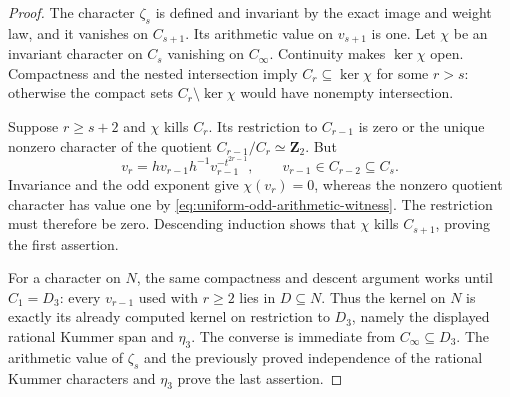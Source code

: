 \begin{proof}
The character $\zeta_s$ is defined and invariant by the exact image
and weight law, and it vanishes on $C_{s+1}$. Its arithmetic value
on $v_{s+1}$ is one.
Let $\chi$ be an invariant character on $C_s$ vanishing on
$C_\infty$. Continuity makes $\ker\chi$ open. Compactness and the
nested intersection imply $C_r\subseteq\ker\chi$ for some
$r>s$: otherwise the compact sets $C_r\setminus\ker\chi$ would
have nonempty intersection.

Suppose $r\ge s+2$ and $\chi$ kills $C_r$. Its restriction to
$C_{r-1}$ is zero or the unique nonzero character of the quotient
$C_{r-1}/C_r\simeq\mathbf Z_2$. But
\[
 v_r=h v_{r-1}h^{-1}v_{r-1}^{-t^{2r-1}},
 \qquad v_{r-1}\in C_{r-2}\subseteq C_s.
\]
Invariance and the odd exponent give $\chi(v_r)=0$, whereas the
nonzero quotient character has value one by
\eqref{eq:uniform-odd-arithmetic-witness}. The restriction must
therefore be zero. Descending induction shows that $\chi$ kills
$C_{s+1}$, proving the first assertion.

For a character on $N$, the same compactness and descent argument
works until $C_1=D_3$: every $v_{r-1}$ used with $r\ge2$ lies
in $D\subseteq N$. Thus the kernel on $N$ is exactly its already
computed kernel on restriction to $D_3$, namely the displayed
rational Kummer span and $\eta_3$. The converse is immediate from
$C_\infty\subseteq D_3$. The arithmetic value of $\zeta_s$ and
the previously proved independence of the rational Kummer
characters and $\eta_3$ prove the last assertion.
\end{proof}

